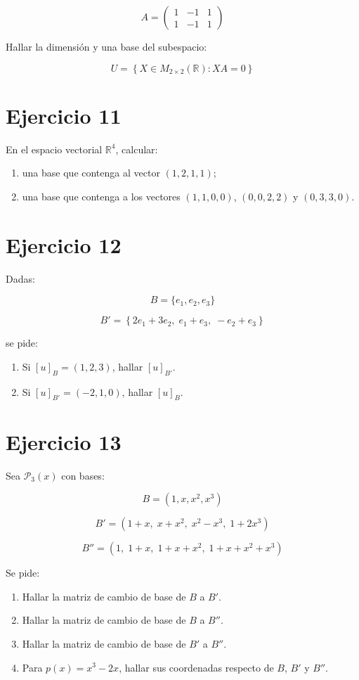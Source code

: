 \documentclass[11pt,a4paper]{article}
\newcommand{\R}{\mathbb{R}}
\newcommand{\Pn}{\mathcal{P}}
\begin{document}
\[
A=
\begin{pmatrix}
1&-1&1\\
1&-1&1
\end{pmatrix}
\]

Hallar la dimensión y una base del subespacio:

\[
U=
\left\{
X\in M_{2\times2}(\R):
XA=0
\right\}
\]

\section{Ejercicio 11}
En el espacio vectorial $\R^4$, calcular:

\begin{enumerate}[label=\alph*)]
	\item una base que contenga al vector $(1,2,1,1)$;
	\item una base que contenga a los vectores $(1,1,0,0)$, $(0,0,2,2)$ y $(0,3,3,0)$.
\end{enumerate}

\section{Ejercicio 12}
Dadas:

\[
B=\{e_1,e_2,e_3\}
\]

\[
B'=
\left\{
2e_1+3e_2,\;
e_1+e_3,\;
-e_2+e_3
\right\}
\]

se pide:

\begin{enumerate}[label=\alph*)]
	\item Si $[u]_B=(1,2,3)$, hallar $[u]_{B'}$.
	\item Si $[u]_{B'}=(-2,1,0)$, hallar $[u]_B$.
\end{enumerate}

\section{Ejercicio 13}
Sea $\Pn_3(x)$ con bases:

\[
B=(1,x,x^2,x^3)
\]

\[
B'=
(1+x,\;x+x^2,\;x^2-x^3,\;1+2x^3)
\]

\[
B''=
(1,\;1+x,\;1+x+x^2,\;1+x+x^2+x^3)
\]

Se pide:

\begin{enumerate}[label=\alph*)]
	\item Hallar la matriz de cambio de base de $B$ a $B'$.
	\item Hallar la matriz de cambio de base de $B$ a $B''$.
	\item Hallar la matriz de cambio de base de $B'$ a $B''$.
	\item Para $p(x)=x^3-2x$, hallar sus coordenadas respecto de $B$, $B'$ y $B''$.
\end{enumerate}
\end{document}
